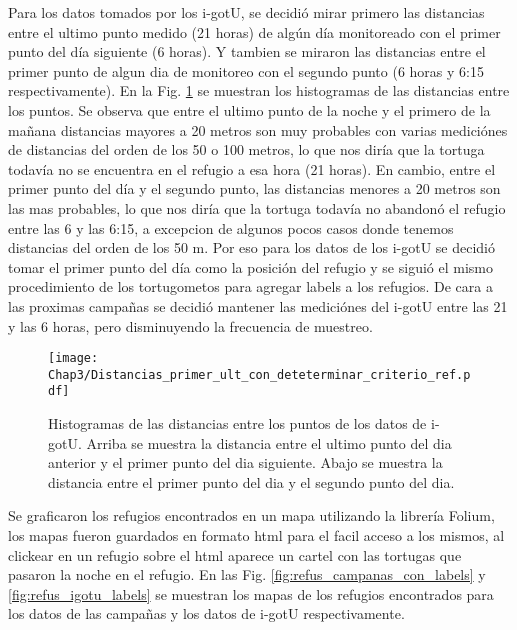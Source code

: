Para los datos tomados por los i-gotU, se decidió mirar primero las distancias entre el ultimo punto medido (21 horas) de algún día monitoreado con el primer punto del día siguiente (6 horas). Y tambien se miraron las distancias entre el primer punto de algun dia de monitoreo con el segundo punto (6 horas y 6:15 respectivamente). En la Fig. \ref{fig:distancias} se muestran los histogramas de las distancias entre los puntos. Se observa que entre el ultimo punto de la noche y el primero de la mañana distancias mayores a 20 metros son muy probables con varias mediciónes de distancias del orden de los 50 o 100 metros, lo que nos diría que la tortuga todavía no se encuentra en el refugio a esa hora (21 horas). En cambio, entre el primer punto del día y el segundo punto, las distancias menores a 20 metros son las mas probables, lo que nos diría que la tortuga todavía no abandonó el refugio entre las 6 y las 6:15, a excepcion de algunos pocos casos donde tenemos distancias del orden de los 50 m. Por eso para los datos de los i-gotU se decidió tomar el primer punto del día como la posición del refugio y se siguió el mismo procedimiento de los tortugometos para agregar labels a los refugios. De cara a las proximas campañas se decidió mantener las mediciónes del i-gotU entre las 21 y las 6 horas, pero disminuyendo la frecuencia de muestreo. 


\begin{figure}[ht]
    \begin{center}
        \texttt{[image: Chap3/Distancias\_primer\_ult\_con\_deteterminar\_criterio\_ref.pdf]}
        \caption[Histogramas de las distancias entre los puntos de los datos de i-gotU.]{ Histogramas de las distancias entre los puntos de los datos de i-gotU. Arriba se muestra la distancia entre el ultimo punto del dia anterior y el primer punto del dia siguiente. Abajo se muestra la distancia entre el primer punto del dia y el segundo punto del dia.} 
        \label{fig:distancias}
        \end{center}
\end{figure} 

Se graficaron los refugios encontrados en un mapa utilizando la librería Folium, los mapas fueron guardados en formato html para el facil acceso a los mismos, al clickear en un refugio sobre el html aparece un cartel con las tortugas que pasaron la noche en el refugio. En las Fig. \ref{fig:refus_campanas_con_labels} y \ref{fig:refus_igotu_labels} se muestran los mapas de los refugios encontrados para los datos de las campañas y los datos de i-gotU respectivamente.


